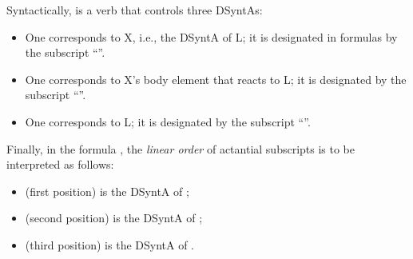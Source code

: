 \begin{center}
\label{tab:ObstrExcessSup}
\end{center}

Syntactically,  is a verb that controls three DSyntAs:

\begin{itemize}
 
\item One corresponds to X, i.e., the DSyntA\thinspace{} of L; it is designated in  formulas by the subscript ``''.

\item One corresponds to X's body element that reacts to L; it is designated by the subscript ``''.

\item One corresponds to L; it is designated by the subscript ``''.

\end{itemize}

Finally, in the formula , the \emph{linear order} of actantial subscripts is to be interpreted as follows:

\begin{itemize}
 
\item {} (first position) is the DSyntA\thinspace{} of ;
\item {} (second position) is the DSyntA\thinspace{} of ;
\item {} (third position) is the DSyntA\thinspace{} of .

\end{itemize}

